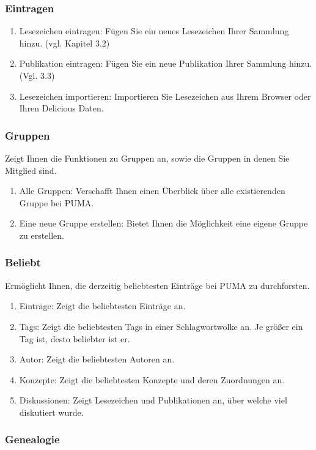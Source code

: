 \documentclass[b5paper,11pt,twoside]{scrbook} %
\begin{document}
\subsubsection{Eintragen}
\begin{enumerate}
    \item Lesezeichen eintragen: Fügen Sie ein neues Lesezeichen Ihrer Sammlung hinzu. (vgl. Kapitel 3.2) 
    \item Publikation eintragen: Fügen Sie ein neue Publikation Ihrer Sammlung hinzu. (Vgl. 3.3)
    \item Lesezeichen importieren: Importieren Sie Lesezeichen aus Ihrem Browser oder Ihren Delicious Daten.
\end{enumerate}


\subsubsection{Gruppen}
Zeigt Ihnen die Funktionen zu Gruppen an, sowie die Gruppen in denen Sie Mitglied sind.
\begin{enumerate}
    \item Alle Gruppen: Verschafft Ihnen einen Überblick über alle existierenden Gruppe bei PUMA.
    \item Eine neue Gruppe erstellen: Bietet Ihnen die Möglichkeit eine eigene Gruppe zu erstellen.
\end{enumerate}
\subsubsection{Beliebt}
Ermöglicht Ihnen, die derzeitig beliebtesten Einträge bei PUMA zu durchforsten.
\begin{enumerate}
    \item Einträge: Zeigt die beliebtesten Einträge an.
    \item Tags: Zeigt die beliebtesten Tags in einer Schlagwortwolke an. Je größer ein Tag ist, desto beliebter ist er.
    \item Autor: Zeigt die beliebtesten Autoren an.
    \item Konzepte: Zeigt die beliebtesten Konzepte und deren Zuordnungen an. 
    \item Diskussionen: Zeigt Lesezeichen und Publikationen an, über welche viel diskutiert wurde. 
\end{enumerate}
\subsubsection{Genealogie}
\end{document}
